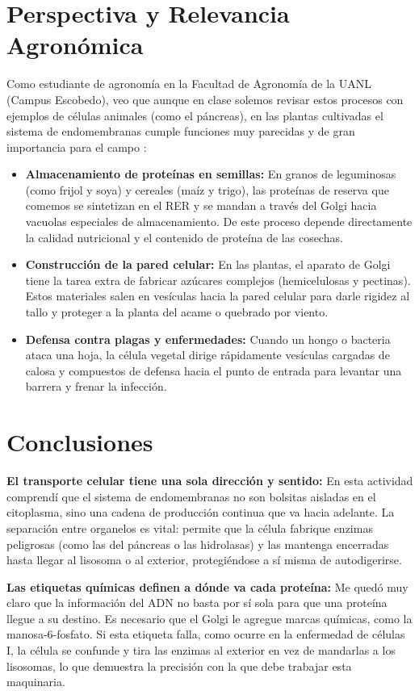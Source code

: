 \documentclass[12pt,spanish,letterpaper,oneside]{article}
\begin{document}
\section{Perspectiva y Relevancia Agronómica}
Como estudiante de agronomía en la Facultad de Agronomía de la UANL (Campus Escobedo), veo que aunque en clase solemos revisar estos procesos con ejemplos de células animales (como el páncreas), en las plantas cultivadas el sistema de endomembranas cumple funciones muy parecidas y de gran importancia para el campo \parencite{taiz2015plant}:
\begin{itemize}
    \item \textbf{Almacenamiento de proteínas en semillas:} En granos de leguminosas (como frijol y soya) y cereales (maíz y trigo), las proteínas de reserva que comemos se sintetizan en el RER y se mandan a través del Golgi hacia vacuolas especiales de almacenamiento. De este proceso depende directamente la calidad nutricional y el contenido de proteína de las cosechas.
    \item \textbf{Construcción de la pared celular:} En las plantas, el aparato de Golgi tiene la tarea extra de fabricar azúcares complejos (hemicelulosas y pectinas). Estos materiales salen en vesículas hacia la pared celular para darle rigidez al tallo y proteger a la planta del acame o quebrado por viento.
    \item \textbf{Defensa contra plagas y enfermedades:} Cuando un hongo o bacteria ataca una hoja, la célula vegetal dirige rápidamente vesículas cargadas de calosa y compuestos de defensa hacia el punto de entrada para levantar una barrera y frenar la infección.
\end{itemize}

\clearpage

\section{Conclusiones}

\textbf{El transporte celular tiene una sola dirección y sentido:} En esta actividad comprendí que el sistema de endomembranas no son bolsitas aisladas en el citoplasma, sino una cadena de producción continua que va hacia adelante. La separación entre organelos es vital: permite que la célula fabrique enzimas peligrosas (como las del páncreas o las hidrolasas) y las mantenga encerradas hasta llegar al lisosoma o al exterior, protegiéndose a sí misma de autodigerirse.

\textbf{Las etiquetas químicas definen a dónde va cada proteína:} Me quedó muy claro que la información del ADN no basta por sí sola para que una proteína llegue a su destino. Es necesario que el Golgi le agregue marcas químicas, como la manosa-6-fosfato. Si esta etiqueta falla, como ocurre en la enfermedad de células I, la célula se confunde y tira las enzimas al exterior en vez de mandarlas a los lisosomas, lo que demuestra la precisión con la que debe trabajar esta maquinaria.
\end{document}
